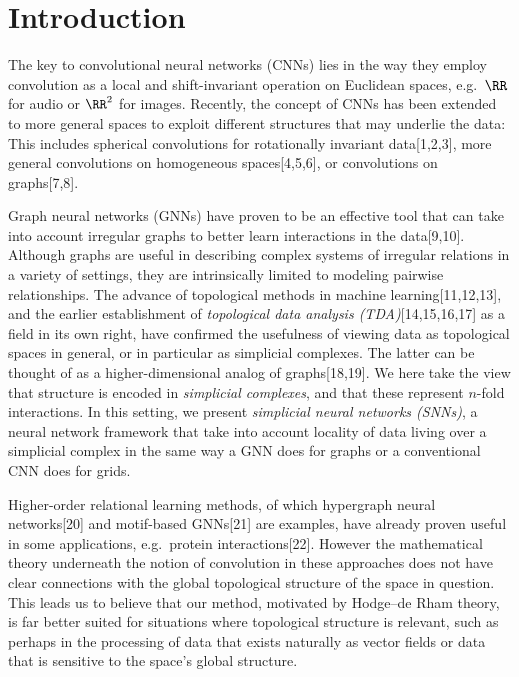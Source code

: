 \section{Introduction}

The key to convolutional neural networks (CNNs) lies in the way they employ convolution as a local and shift-invariant operation on Euclidean spaces, e.g.\ $\RR$ for audio or $\RR^2$ for images.
Recently, the concept of CNNs has been extended to more general spaces to exploit different structures that may underlie the data:
This includes spherical convolutions for rotationally invariant data[1,2,3], more general convolutions on homogeneous spaces[4,5,6], or convolutions on graphs[7,8].

Graph neural networks (GNNs) have proven to be an effective tool that can take into account irregular graphs to better learn interactions in the data[9,10].
Although graphs are useful in describing complex systems of irregular relations in a variety of settings, they are intrinsically limited to modeling pairwise relationships. The advance of topological methods in machine learning[11,12,13], and the earlier establishment of \emph{topological data analysis (TDA)}[14,15,16,17] as a field in its own right, have confirmed the usefulness of viewing data as topological spaces in general, or in particular as simplicial complexes. The latter can be thought of as a higher-dimensional analog of graphs[18,19]. We here take the view that structure is encoded in \emph{simplicial complexes}, and that these represent $n$-fold interactions. In this setting, we present \emph{simplicial neural networks (SNNs)}, a neural network framework that take into account locality of data living over a simplicial complex in the same way a GNN does for graphs or a conventional CNN does for grids.

Higher-order relational learning methods, of which hypergraph neural networks[20] and motif-based GNNs[21] are examples, have already proven useful in some applications, e.g.\ protein interactions[22]. However the mathematical theory underneath the notion of convolution in these approaches does not have clear connections with the global topological structure of the space in question. This leads us to believe that our method, motivated by Hodge--de Rham theory, is far better suited for situations where topological structure is relevant, such as perhaps in the processing of data that exists naturally as vector fields or data that is sensitive to the space's global structure.
